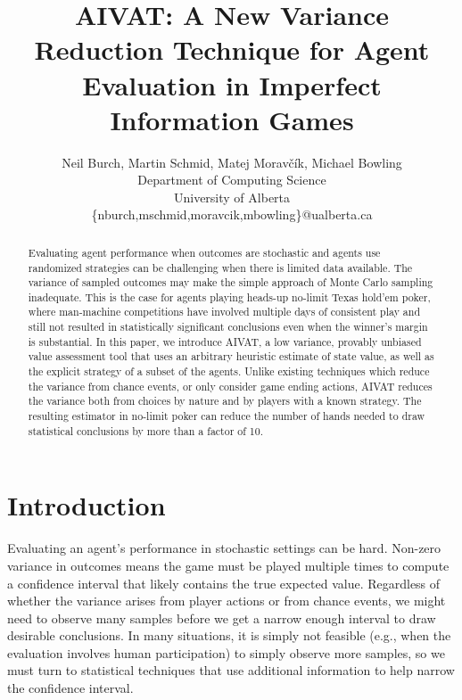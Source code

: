 \documentclass[letterpaper]{article}
\def\VAT{AIVAT}
\begin{document}
\title{AIVAT: A New Variance Reduction Technique for Agent Evaluation in Imperfect Information Games}
\author{Neil Burch, Martin Schmid, Matej Moravčík, Michael Bowling \\
Department of Computing Science \\
University of Alberta\\
\{nburch,mschmid,moravcik,mbowling\}@ualberta.ca
}
\maketitle

\begin{abstract}
Evaluating agent performance when outcomes are stochastic and agents
use randomized strategies can be challenging when there is limited
data available. The variance of sampled outcomes may make the simple
approach of Monte Carlo sampling inadequate. This is the case for
agents playing heads-up no-limit Texas hold'em poker, where
man-machine competitions have involved multiple days of consistent
play and still not resulted in statistically significant conclusions
even when the winner's margin is substantial. In this paper, we
introduce \VAT{}, a low variance, provably unbiased value assessment
tool that uses an arbitrary heuristic estimate of state value, as well
as the explicit strategy of a subset of the agents. Unlike existing
techniques which reduce the variance from chance events, or only
consider game ending actions, \VAT{} reduces the variance both from
choices by nature and by players with a known strategy. The resulting
estimator in no-limit poker can reduce the number of hands needed to
draw statistical conclusions by more than a factor of 10.
\end{abstract}


\section{Introduction}
Evaluating an agent's performance in stochastic settings can be hard.
Non-zero variance in outcomes means the game must be played multiple
times to compute a confidence interval that likely contains the true
expected value. Regardless of whether the variance arises from player
actions or from chance events, we might need to observe many samples
before we get a narrow enough interval to draw desirable conclusions.
In many situations, it is simply not feasible (e.g., when the
evaluation involves human participation) to simply observe more
samples, so we must turn to statistical techniques that use additional
information to help narrow the confidence interval.
\end{document}
